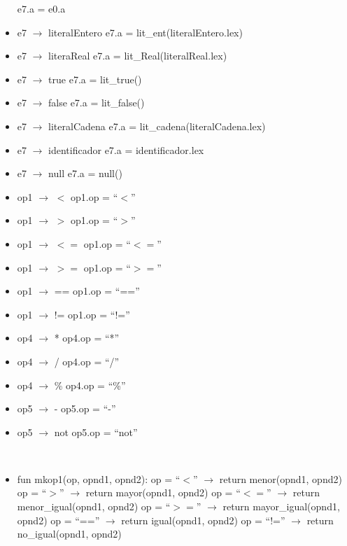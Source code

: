 \documentclass[11pt]{article}
\begin{document}
\begin{itemize}
                \subitem e7.a = e0.a
            \item e7 $\rightarrow$ literalEntero
                \subitem e7.a = lit\_ent(literalEntero.lex)
            \item e7 $\rightarrow$ literaReal
                \subitem e7.a = lit\_Real(literalReal.lex)
            \item e7 $\rightarrow$ true
                \subitem e7.a = lit\_true()
            \item e7 $\rightarrow$ false
                \subitem e7.a = lit\_false()
            \item e7 $\rightarrow$ literalCadena
                \subitem e7.a = lit\_cadena(literalCadena.lex)
            \item e7 $\rightarrow$ identificador
                \subitem e7.a = identificador.lex
            \item e7 $\rightarrow$ null
                \subitem e7.a = null()
            \item op1 $\rightarrow$ $<$
                \subitem op1.op = “$<$”
            \item op1 $\rightarrow$ $>$
                \subitem op1.op = “$>$”
            \item op1 $\rightarrow$ $<=$
                \subitem op1.op = “$<=$”
            \item op1 $\rightarrow$ $>=$
                \subitem op1.op = “$>=$”
            \item op1 $\rightarrow$ ==
                \subitem op1.op = “==”
            \item op1 $\rightarrow$ !=
                \subitem op1.op = “!=”
            \item op4 $\rightarrow$ *
                \subitem op4.op = “*”
            \item op4 $\rightarrow$ /
                \subitem op4.op = “/”
            \item op4 $\rightarrow$ \%
                \subitem op4.op = “\%”
            \item op5 $\rightarrow$ -
                \subitem op5.op = “-”
            \item op5 $\rightarrow$ not
                \subitem op5.op = “not”
        \end{itemize}   
        \
        \begin{itemize}
            \item fun mkop1(op, opnd1, opnd2):
                \subitem op = “$<$”    $\rightarrow$ return menor(opnd1, opnd2)
                \subitem op = “$>$”    $\rightarrow$ return mayor(opnd1, opnd2)
                \subitem op = “$<=$”  $\rightarrow$ return menor\_igual(opnd1, opnd2)
                \subitem op = “$>=$”  $\rightarrow$ return mayor\_igual(opnd1, opnd2)
                \subitem op = “==”  $\rightarrow$ return igual(opnd1, opnd2)
                \subitem op = “!=”   $\rightarrow$ return no\_igual(opnd1, opnd2)
        \end{itemize}
\end{document}
